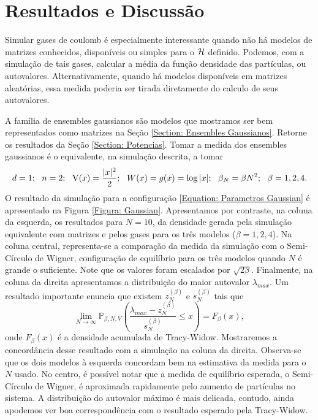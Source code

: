 \section{Resultados e Discussão}

Simular gases de coulomb é especialmente interessante quando não há modelos de matrizes conhecidos, disponíveis ou simples para o $\operatorname{\mathcal{H}}$ definido. Podemos, com a simulação de tais gases, calcular a média da função densidade das partículas, ou autovalores. Alternativamente, quando há modelos disponíveis em matrizes aleatórias, essa medida poderia ser tirada diretamente do calculo de seus autovalores.

A família de ensembles gaussianos são modelos que mostramos ser bem representados como matrizes na Seção \ref{Section: Ensembles Gaussianos}. Retorne os resultados da Seção \ref{Section: Potencias}. Tomar a medida dos ensembles gaussianos é o equivalente, na simulação descrita, a tomar 
\begin{equation}
d = 1; \ \  n = 2; \ \ \V(x)=\frac{|x|^2}{2}; \ \ W(x) = g(x) = \log{|x|}; \ \ \beta_N = \beta N^2; \ \ \beta = 1,2,4.
\label{Equation: Parametros Gaussian}
\end{equation}
O resultado da simulação para a configuração \ref{Equation: Parametros Gaussian} é apresentado na Figura \ref{Figura: Gaussian}. Apresentamos por contraste, na coluna da esquerda, os resultados para $N=10$, da densidade gerada pela simulação equivalente com matrizes e pelos gases para os três modelos ($\beta = 1,2,4$). Na coluna central, representa-se a comparação da medida da simulação com o Semi-Círculo de Wigner, configuração de equilíbrio para os três modelos quando $N$ é grande o suficiente. Note que os valores foram escalados por $\sqrt{2 \beta}$. Finalmente, na coluna da direita apresentamos a distribuição do maior autovalor $\lambda_{max}$. Um resultado importante  \cite{Tracy} enuncia que existem $z_{N}^{(\beta)}$ e $s_N^{(\beta)}$ tais que $$\lim_{N \to \infty} \mathbb{P}_{\beta,N,V} \left( \frac{\lambda_{max} - z_{N}^{(\beta)}}{s_N^{(\beta)}} \leq x \right) = F_{\beta}(x),$$ onde $F_{\beta}(x)$ é a densidade acumulada de Tracy-Widow. Mostraremos a concordância desse resultado com a simulação na coluna da direita. Observa-se que os dois modelos à esquerda concordam bem na estimativa da medida para o $N$ usado. No centro, é possível notar que a medida de equilíbrio esperada, o Semi-Círculo de Wigner, é aproximada rapidamente pelo aumento de partículas no sistema. A distribuição do autovalor máximo é mais delicada, contudo, ainda apodemos ver boa correspondência com o resultado esperado pela Tracy-Widow.
